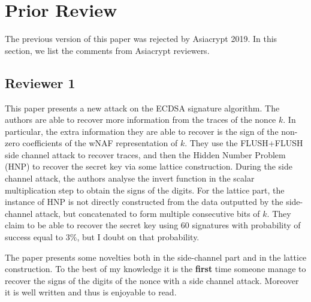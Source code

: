 \section{Prior Review}
\label{sec:Appendix}
The previous version of this paper was rejected by Asiacrypt 2019. %
In this section, we list the comments from Asiacrypt reviewers.

\subsection{Reviewer 1}
This paper presents a new attack on the ECDSA signature algorithm. The authors are able to recover more information from the traces of the nonce $k$. 
In particular, the extra information they are able to recover is the sign of the non-zero coefficients of the wNAF representation of $k$.
They use the FLUSH+FLUSH side channel attack to recover traces, and then the Hidden Number Problem (HNP) to recover the secret key via some lattice construction. 
During the side channel attack, the authors analyse the invert function in the scalar multiplication step to obtain the signs of the digits.
For the lattice part, the instance of HNP is not directly constructed from the data outputted by the side-channel attack, but concatenated to form multiple
consecutive bits of $k$. They claim to be able to recover the secret key using $60$ signatures with probability of success equal to $3\%$, but I doubt on that probability. 

 The paper presents some novelties both in the side-channel part and in the lattice construction. To the best of my knowledge it is the \textbf{first} time someone
manage to recover the signs of the digits of the nonce with a side channel attack. Moreover it is well written and thus is enjoyable to read. 

